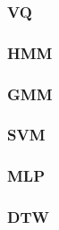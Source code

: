 \subsubsection{VQ}
\subsubsection{HMM}
\subsubsection{GMM}
\subsubsection{SVM}
\subsubsection{MLP}
\subsubsection{DTW}